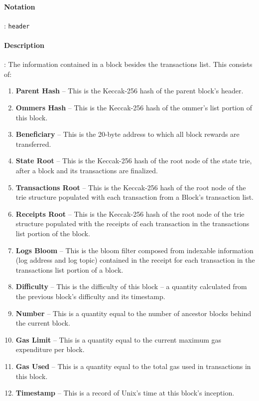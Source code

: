 \documentclass[10pt,a4paper,leqno,bibliography=totoc]{scrartcl}
\newenvironment{alphafootnotes}
{\par\edef\savedfootnotenumber{\number\value{footnote}}
\renewcommand{\thefootnote}{\alph{footnote}}
\setcounter{footnote}{0}}
{\par\setcounter{footnote}{\savedfootnotenumber}}
\begin{document}
\begin{alphafootnotes}
\begin{multicols*}{2}
				\paragraph{Notation}: \texttt{header} 
				\paragraph{Description}: The information contained in a block besides the transactions list. This consists of:

				\begin{enumerate}
					\item \textbf{Parent Hash} -- This is the Keccak-256 hash of the parent block's header.
					\item \textbf{Ommers Hash} -- This is the Keccak-256 hash of the ommer's list portion of this block.
					\item \textbf{Beneficiary} -- This is the 20-byte address to which all block rewards are transferred.
					\item \textbf{State Root} -- This is the Keccak-256 hash of the root node of the state trie, after a block and its transactions are finalized.
					\item \textbf{Transactions Root} -- This is the Keccak-256 hash of the root node of the trie structure populated with each transaction from a Block's transaction list.
					\item \textbf{Receipts Root} -- This is the Keccak-256 hash of the root node of the trie structure populated with the receipts of each transaction in the transactions list portion of the block.
					\item \textbf{Logs Bloom} -- This is the bloom filter composed from indexable information (log address and log topic) contained in the receipt for each transaction in the transactions list portion of a block.
					\item \textbf{Difficulty} -- This is the difficulty of this block -- a quantity calculated from the previous block's difficulty and its timestamp.
					\item \textbf{Number} -- This is a quantity equal to the number of ancestor blocks behind the current block.
					\item \textbf{Gas Limit} -- This is a quantity equal to the current maximum gas expenditure per block.
					\item \textbf{Gas Used} -- This is a quantity equal to the total gas used in transactions in this block.
					\item \textbf{Timestamp} -- This is a record of Unix's time at this block's inception.

\end{enumerate}
\end{multicols*}
\end{alphafootnotes}
\end{document}
